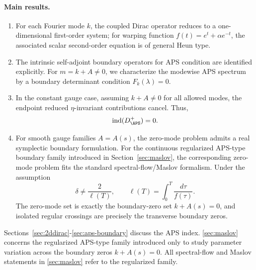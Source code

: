 \documentclass[11pt]{article}
\theoremstyle{definition}
\DeclareMathOperator{\ind}{ind}
\numberwithin{equation}{section}
\begin{document}
\paragraph{Main results.}
\begin{enumerate}[label=(\roman*)]
\item For each Fourier mode \(k\), the coupled Dirac operator reduces to a one-dimensional first-order system; for warping function \(f(t)=e^t+\alpha e^{-t}\), the associated scalar second-order equation is of general Heun type.

\item The intrinsic self-adjoint boundary operators for APS condition are identified explicitly. For \(m=k+A\neq 0\),  we characterize the modewise APS spectrum by a boundary determinant condition \(F_k(\lambda)=0\).

\item In the constant gauge case, assuming \(k+A\neq 0\) for all allowed modes, the endpoint reduced \(\eta\)-invariant contributions cancel. Thus,
\begin{equation}
\ind(D^+_{\APS})=0.
\end{equation}

\item For smooth gauge families \(A=A(s)\), the zero-mode problem admits a real symplectic boundary formulation. For the continuous regularized APS-type boundary family introduced in Section~\ref{sec:maslov}, the corresponding zero-mode problem fits the standard spectral-flow/Maslov formalism. Under the assumption
\[
\delta \neq \frac{2}{\ell(T)},
\qquad
\ell(T)=\int_0^T \frac{d\tau}{f(\tau)}.
\]
The zero-mode set is exactly the boundary-zero set \(k+A(s)=0\), and isolated regular crossings are precisely the transverse boundary zeros.
\end{enumerate}

Sections~\ref{sec:2ddirac}-\ref{sec:aps-boundary} discuss the APS index. \autoref{sec:maslov} concerns the regularized APS-type family introduced only to study parameter variation across the boundary zeros \(k+A(s)=0\). All spectral-flow and Maslov statements in \autoref{sec:maslov} refer to the regularized family.
\end{document}
